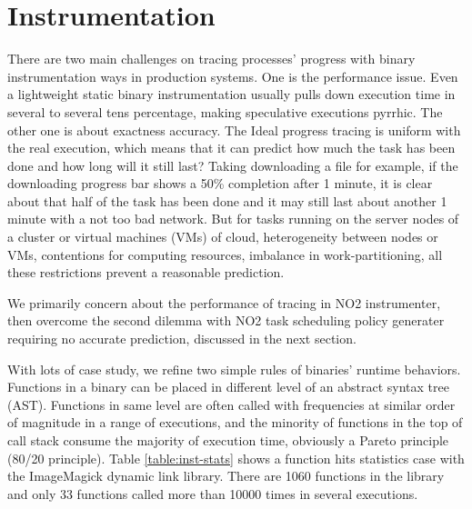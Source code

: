 \section{Instrumentation}

There are two main challenges on tracing processes’ progress with binary instrumentation ways in production systems. One is the performance issue. Even a lightweight static binary instrumentation usually pulls down execution time in several to several tens percentage, making speculative executions pyrrhic.  The other one is about exactness accuracy. The Ideal progress tracing is uniform with the real execution, which means that it can predict how much the task has been done and how long will it still last? Taking downloading a file for example, if the downloading progress bar shows a 50\% completion after 1 minute, it is clear about that half of the task has been done and it may still last about another 1 minute with a not too bad network. But for tasks running on the server nodes of a cluster or virtual machines (VMs) of cloud, heterogeneity between nodes or VMs, contentions for computing resources, imbalance in work-partitioning, all these restrictions prevent a reasonable prediction.

We primarily concern about the performance of tracing in NO2 instrumenter, then overcome the second dilemma with NO2 task scheduling policy generater requiring no accurate prediction, discussed in the next section.

With lots of case study, we refine two simple rules of binaries' runtime behaviors. Functions in a binary can be placed in different level of an abstract syntax tree (AST). Functions in same level are often called with frequencies at similar order of magnitude in a range of executions, and the minority of functions in the top of call stack consume the majority of execution time, obviously a Pareto principle (80/20 principle). Table \ref{table:inst-stats} shows a function hits statistics case with the ImageMagick dynamic link library. There are 1060 functions in the library and only 33 functions called more than 10000 times in several executions.


